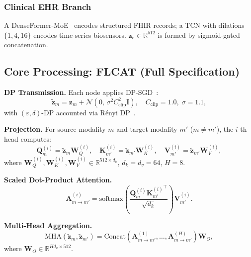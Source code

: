 \documentclass[journal,draftclsnofoot,10pt,onecolumn]{IEEEtran}
\begin{document}
\subsubsection{Clinical EHR Branch}
A DenseFormer-MoE~\cite{denseformer2024} encodes structured FHIR records;
a TCN with dilations $\{1,4,16\}$ encodes time-series biosensors.
$\mathbf{z}_e\!\in\!\mathbb{R}^{512}$ is formed by sigmoid-gated concatenation.

\subsection{Core Processing: FLCAT (Full Specification)}
\label{subsec:flcat}

\textbf{DP Transmission.} Each node applies DP-SGD~\cite{abadi2016dpsgd}:
\begin{equation}
\tilde{\mathbf{z}}_m = \mathbf{z}_m +
\mathcal{N}(0,\,\sigma^2 C_{\mathrm{clip}}^2\mathbf{I}),\quad
C_{\mathrm{clip}}\!=\!1.0,\;\sigma\!=\!1.1,
\label{eq:dp}
\end{equation}
with $(\varepsilon,\delta)$-DP accounted via R\'{e}nyi DP~\cite{mironov2017renyi}.

\textbf{Projection.} For source modality $m$ and target modality $m'$
($m\!\neq\!m'$), the $i$-th head computes:
\begin{equation}
\mathbf{Q}_m^{(i)} = \tilde{\mathbf{z}}_m \mathbf{W}_Q^{(i)},\quad
\mathbf{K}_{m'}^{(i)} = \tilde{\mathbf{z}}_{m'}\mathbf{W}_K^{(i)},\quad
\mathbf{V}_{m'}^{(i)} = \tilde{\mathbf{z}}_{m'}\mathbf{W}_V^{(i)},
\label{eq:proj}
\end{equation}
where $\mathbf{W}_Q^{(i)},\mathbf{W}_K^{(i)},\mathbf{W}_V^{(i)}\!
\in\!\mathbb{R}^{512\times d_k}$, $d_k\!=\!d_v\!=\!64$, $H\!=\!8$.

\textbf{Scaled Dot-Product Attention.}
\begin{equation}
\mathbf{A}^{(i)}_{m\to m'} =
\mathrm{softmax}\!\left(\frac{\mathbf{Q}_m^{(i)}
{\mathbf{K}_{m'}^{(i)}}^\top}{\sqrt{d_k}}\right)\mathbf{V}_{m'}^{(i)}.
\label{eq:attn}
\end{equation}

\textbf{Multi-Head Aggregation.}
\begin{equation}
\mathrm{MHA}(\tilde{\mathbf{z}}_m,\tilde{\mathbf{z}}_{m'}) =
\mathrm{Concat}\!\left(\mathbf{A}^{(1)}_{m\to m'},\ldots,
\mathbf{A}^{(H)}_{m\to m'}\right)\mathbf{W}_O,
\label{eq:mha}
\end{equation}
where $\mathbf{W}_O\!\in\!\mathbb{R}^{H d_v\times 512}$.
\end{document}
